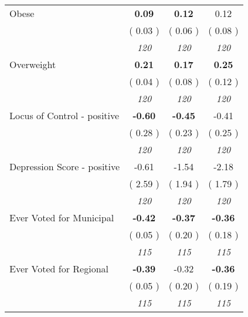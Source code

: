 \begin{tabular}{l c c c}
Obese & \textbf{      0.09 } & \textbf{      0.12 } &      0.12 \\
& (     0.03 ) & (     0.06 ) & (     0.08 ) \\
& \textit{ 120 } & \textit{ 120 } & \textit{ 120 } \\
Overweight & \textbf{      0.21 } & \textbf{      0.17 } & \textbf{      0.25 } \\
& (     0.04 ) & (     0.08 ) & (     0.12 ) \\
& \textit{ 120 } & \textit{ 120 } & \textit{ 120 } \\
Locus of Control - positive & \textbf{     -0.60 } & \textbf{     -0.45 } &     -0.41 \\
& (     0.28 ) & (     0.23 ) & (     0.25 ) \\
& \textit{ 120 } & \textit{ 120 } & \textit{ 120 } \\
Depression Score - positive &     -0.61 &     -1.54 &     -2.18 \\
& (     2.59 ) & (     1.94 ) & (     1.79 ) \\
& \textit{ 120 } & \textit{ 120 } & \textit{ 120 } \\
Ever Voted for Municipal & \textbf{     -0.42 } & \textbf{     -0.37 } & \textbf{     -0.36 } \\
& (     0.05 ) & (     0.20 ) & (     0.18 ) \\
& \textit{ 115 } & \textit{ 115 } & \textit{ 115 } \\
Ever Voted for Regional & \textbf{     -0.39 } &     -0.32 & \textbf{     -0.36 } \\
& (     0.05 ) & (     0.20 ) & (     0.19 ) \\
& \textit{ 115 } & \textit{ 115 } & \textit{ 115 } \\
\bottomrule
\end{tabular}
